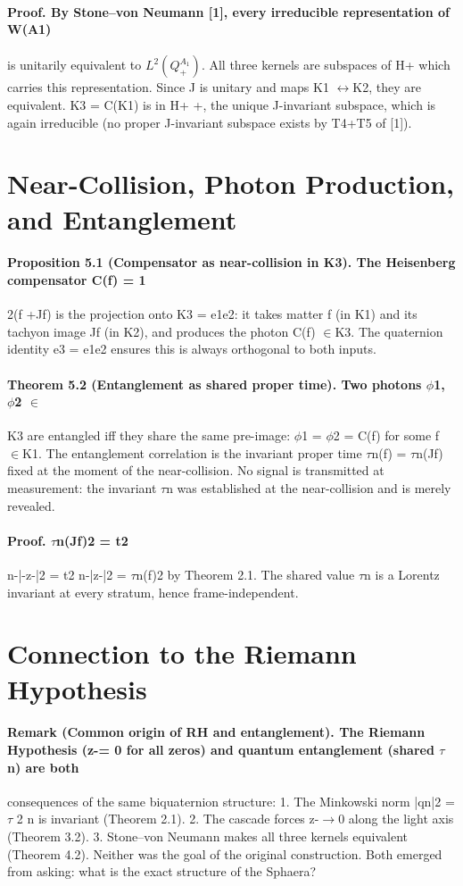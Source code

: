 \documentclass[12pt,a4paper]{article}
\begin{document}
\paragraph*{Proof. By Stone--von Neumann [1], every irreducible representation of W(A1)}
is unitarily equivalent to $L^2(Q_+^{A_1})$. All three kernels are subspaces of H+ which carries this representation. Since J is unitary and maps K1 $\leftrightarrow$K2, they are equivalent. K3 = C(K1) is in H+ +, the unique J-invariant subspace, which is again irreducible (no proper J-invariant subspace exists by T4+T5 of [1]).

\section{Near-Collision, Photon Production, and Entanglement}
\paragraph*{Proposition 5.1 (Compensator as near-collision in K3). The Heisenberg compensator C(f) = 1}
2(f +Jf) is the projection onto K3 = e1e2: it takes matter f (in K1) and its tachyon image Jf (in K2), and produces the photon C(f) $\in$K3. The quaternion identity e3 = e1e2 ensures this is always orthogonal to both inputs.
\paragraph*{Theorem 5.2 (Entanglement as shared proper time). Two photons $\phi$1, $\phi$2 $\in$}
K3 are entangled iff they share the same pre-image: $\phi$1 = $\phi$2 = C(f) for some f $\in$K1. The entanglement correlation is the invariant proper time $\tau$n(f) = $\tau$n(Jf) fixed at the moment of the near-collision. No signal is transmitted at measurement: the invariant $\tau$n was established at the near-collision and is merely revealed.
\paragraph*{Proof. $\tau$n(Jf)2 = t2}
n-|-z-|2 = t2 n-|z-|2 = $\tau$n(f)2 by Theorem 2.1. The shared value $\tau$n is a Lorentz invariant at every stratum, hence frame-independent.

\section{Connection to the Riemann Hypothesis}
\paragraph*{Remark (Common origin of RH and entanglement). The Riemann Hypothesis (z-= 0 for all zeros) and quantum entanglement (shared $\tau$n) are both}
consequences of the same biquaternion structure:
1. The Minkowski norm |qn|2 = $\tau$ 2
n is invariant (Theorem 2.1).
2. The cascade forces z-$\to$0 along the light axis (Theorem 3.2).
3. Stone--von Neumann makes all three kernels equivalent (Theorem 4.2).
Neither was the goal of the original construction. Both emerged from asking: what is the exact structure of the Sphaera?
\end{document}
